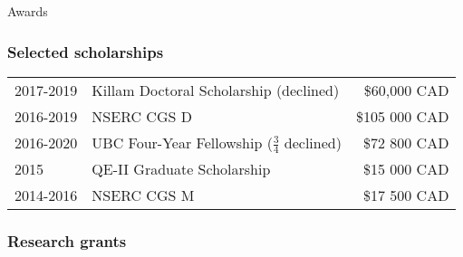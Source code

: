 \documentclass[11pt]{article}
\begin{document}
\noindent\begin{rSection}{Awards}

\subsubsection*{Selected scholarships}
\begin{tabular}{llr}

2017-2019 & Killam Doctoral Scholarship (declined) & \$60,000 CAD\\
2016-2019 & NSERC CGS D &  \$105 000 CAD\\
2016-2020 & UBC Four-Year Fellowship ($\frac{3}{4}$ declined) & \$72 800 CAD\\
2015 & QE-II Graduate Scholarship & \$15 000 CAD\\
2014-2016 & NSERC CGS M & \$17 500 CAD\\
\end{tabular}



\subsubsection*{Research grants}
\begin{tabular}{llr}


\end{tabular}
\end{rSection}
\end{document}
